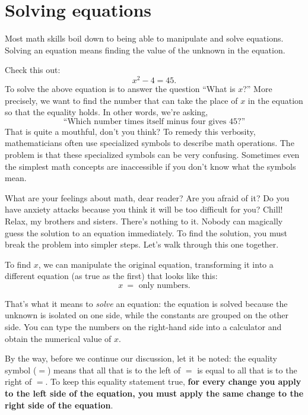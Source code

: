 
\section{Solving equations}
\label{sec:solving_equations}

	Most math skills boil down to being able to manipulate and solve equations. 
	Solving an equation means finding the value of the unknown in the equation.  

	Check this  out:
	\[
	 x^2-4=45.
	\]
	To solve the above equation is to answer
	the question ``What is $x$?''
	More precisely, we want to find the number that can take the 
	place of $x$ in the equation so that the equality holds.
	In other words, we're asking,
	\[
	  \text{``Which number times itself minus four gives 45?''}
	\]
	That is quite a mouthful, don't you think? 
	To remedy this verbosity, mathematicians often use specialized symbols to describe math operations.
	The problem is that these specialized symbols can be very confusing. 
	Sometimes even the simplest math concepts are inaccessible if you don't know what the symbols mean. 

	What are your feelings about math, dear reader? Are you afraid of it? 
	Do you have anxiety attacks because you think it will be too difficult for you?
	Chill! Relax, my brothers and sisters. There's nothing to it.
	Nobody can magically guess the solution to an equation immediately.
	To find the solution, you must break the problem into simpler steps.
	Let's walk through this one together.

	To find $x$, we can manipulate the original equation, 
	transforming it into a different equation (as true as the first) that looks like this:
	\[
	  x \ = \textrm{ only numbers.}
	\]

	\noindent
	That's what it means to \emph{solve} an equation:
	the equation is solved because the unknown is isolated on one side,
	while the constants are grouped on the other side.
	You can type the numbers on the right-hand side into a calculator and obtain the numerical value of $x$.

	By the way, before we continue our discussion,
	let it be noted: the equality symbol ($=$) means that all that is to the left of $=$ 
	is equal to 
	all that is to the right of $=$. 
	To keep this equality statement true,  
	\textbf{for every change you apply to the left side of the equation, 
	you must apply the same change to the right side of the equation}.

